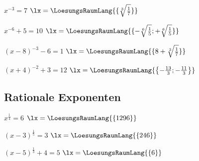 \begin{bbwAufgabenBlock}
\item
 $x^{-3}=7$ \hspace{10mm} $\lx=\LoesungsRaumLang{\{\sqrt[3]{\frac17}\}}$

\item
 $x^{-6}+5 = 10$ \hspace{10mm} $\lx=\LoesungsRaumLang{\{-\sqrt[6]{\frac15}; +\sqrt[6]{\frac15}\}}$
\noTRAINER{\newpage}


\item
 $(x-8)^{-3} - 6 = 1$ \hspace{10mm} $\lx=\LoesungsRaumLang{\{8+\sqrt[3]{\frac17}\}}$


\item
 $(x+4)^{-2} + 3 = 12$ \hspace{10mm} $\lx=\LoesungsRaumLang{\left\{-\frac{13}3; -\frac{11}3\right\}}$

\end{bbwAufgabenBlock}
\noTRAINER{\newpage}



\subsection{Rationale Exponenten}

\begin{bbwAufgabenBlock}
\item
 $x^\frac14 = 6$ \hspace{10mm} $\lx=\LoesungsRaumLang{\{1296\}}$

\item
 $(x-3)^\frac15=3$ \hspace{10mm} $\lx=\LoesungsRaumLang{\{246\}}$  
\noTRAINER{\newpage}

\item
 $(x-5)^{\frac13} +4 = 5$ \hspace{10mm} $\lx=\LoesungsRaumLang{\{6 \}}$

\end{bbwAufgabenBlock}




